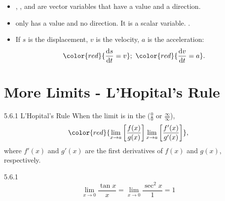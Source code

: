 \documentclass[12pt, a4paper]{article}
\begin{document}
\begin{enumerate}
    \begin{itemize}
        \item {\color{red}{Velocity}}, {\color{red}{displacement}}, and {\color{red}{acceleration}} are vector variables that have a value and a direction. 
        \item {\color{red}{Speed}} only has a value and no direction. It is a scalar variable. {\color{green}{No sign should be reported in the answer}}.
        \item If $s$ is the displacement, $v$ is the velocity, $a$ is the acceleration: $${\color{red}{\frac{\mathrm{d}s}{\mathrm{d}t}=v}};\ {\color{red}{\frac{\mathrm{d}v}{\mathrm{d}t}=a}}.$$
    \end{itemize}
\end{enumerate}

\section{More Limits - L'Hopital's Rule}
\begin{theorem}{5.6.1 L'Hopital's Rule}{}
    When the limit is in the \textbf{\color{red}{indeterminant form}} ($\frac{0}{0}$ or $\frac{\infty}{\infty}$), 
    $${\color{red}{\lim_{x\rightarrow a}\left[\frac{f(x)}{g(x)}\right]\lim_{x\rightarrow a}\left[\frac{f'(x)}{g'(x)}\right]}},$$
    where $f'(x)$ and $g'(x)$ are the first derivatives of $f(x)$ and $g(x)$, respectively. 
\end{theorem}
\begin{example}{5.6.1}{}
    $$\lim_{x\rightarrow 0}\frac{\tan x}{x}=\lim_{x\rightarrow 0}\frac{\sec^2x}{1}=1$$
\end{example}
\end{document}
